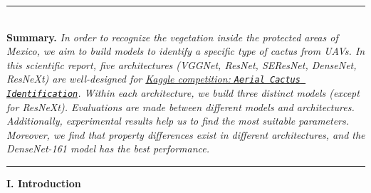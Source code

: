 \documentclass[a4paper]{article}
\newcommand{\HRule}{\rule{\linewidth}{0.5mm}}
\begin{document}
\noindent \HRule
\vspace{2.5mm} \\
\large{\textbf{Summary. }\emph{In order to recognize the vegetation inside the protected areas of Mexico, we aim to build models to identify a specific type of cactus from UAVs. In this scientific report, five architectures (\textsf{VGGNet}, \textsf{ResNet}, \textsf{SEResNet}, \textsf{DenseNet}, \textsf{ResNeXt}) are well-designed for \href{https://www.kaggle.com/c/aerial-cactus-identification}{Kaggle competition: \texttt{Aerial Cactus Identification}}. Within each architecture, we build three distinct models (\textit{except for \textsf{ResNeXt}}). Evaluations are made between different models and architectures. Additionally, experimental results help us to find the most suitable parameters. Moreover, we find that property differences exist in different architectures, and the \textsf{DenseNet-161} model has the best performance. \\ }}
\vspace{2mm}
\HRule

\vspace{6mm}
\begin{center}
\LARGE\textbf{I. Introduction} \\
\end{center}
\vspace{2mm}
\end{document}
